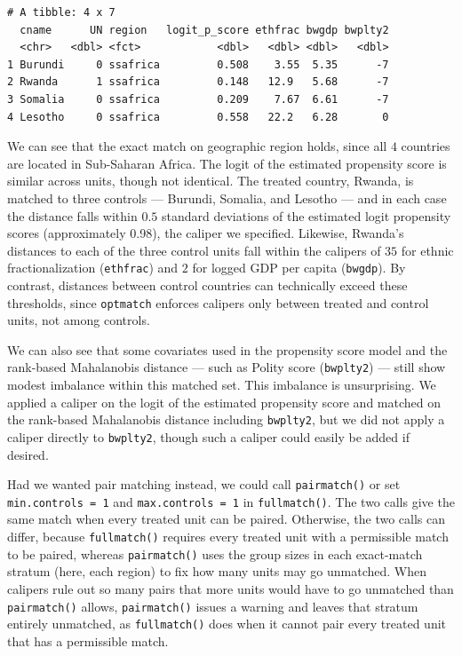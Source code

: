 \documentclass[twoside,11pt]{article}
\begin{document}
\begin{verbatim}
# A tibble: 4 x 7
  cname      UN region   logit_p_score ethfrac bwgdp bwplty2
  <chr>   <dbl> <fct>            <dbl>   <dbl> <dbl>   <dbl>
1 Burundi     0 ssafrica         0.508    3.55  5.35      -7
2 Rwanda      1 ssafrica         0.148   12.9   5.68      -7
3 Somalia     0 ssafrica         0.209    7.67  6.61      -7
4 Lesotho     0 ssafrica         0.558   22.2   6.28       0
\end{verbatim}



We can see that the exact match on geographic region holds, since all \(4\)
countries are located in Sub-Saharan Africa. The logit of the estimated
propensity score is similar across units, though not identical. The
treated country, Rwanda, is matched to three controls --- Burundi,
Somalia, and Lesotho --- and in each case the distance falls within
\(0.5\) standard deviations of the estimated logit propensity scores
(approximately 0.98), the caliper we specified. Likewise, Rwanda's
distances to each of the three control units fall within the calipers of
\(35\) for ethnic fractionalization (\texttt{ethfrac}) and \(2\) for
logged GDP per capita (\texttt{bwgdp}). By contrast, distances between
control countries can technically exceed these thresholds, since
\texttt{optmatch} enforces calipers only between treated and control
units, not among controls.

We can also see that some covariates used in the propensity score model
and the rank-based Mahalanobis distance --- such as Polity score
(\texttt{bwplty2}) --- still show modest imbalance within this matched
set. This imbalance is unsurprising. We applied a caliper on the logit
of the estimated propensity score and matched on the rank-based
Mahalanobis distance including \texttt{bwplty2}, but we did not apply a
caliper directly to \texttt{bwplty2}, though such a caliper could easily
be added if desired.

Had we wanted pair matching instead, we could call \texttt{pairmatch()} or set
\texttt{min.controls\ =\ 1} and \texttt{max.controls\ =\ 1} in
\texttt{fullmatch()}. The two calls give the same match when every treated
unit can be paired. Otherwise, the two calls can differ, because
\texttt{fullmatch()} requires every treated unit with a permissible match to be
paired, whereas \texttt{pairmatch()} uses the group sizes in each exact-match stratum
(here, each region) to fix how many units may go unmatched. When calipers rule
out so many pairs that more units would have to go unmatched than
\texttt{pairmatch()} allows, \texttt{pairmatch()} issues a warning and leaves that stratum entirely unmatched, as \texttt{fullmatch()} does when it cannot pair every treated unit that has a permissible match.
\end{document}
